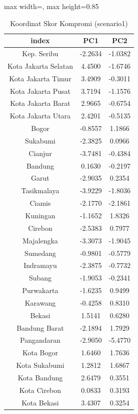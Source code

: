 \begin{table}[H]
\centering
\caption{Koordinat Skor Kompromi (scenario1)} \makeatletter{}\makeatother
\begin{adjustbox}{max width=\textwidth, max height=0.85\textheight}
\begin{tabular}{|c|c|c|}
\hline
\textbf{index} & \textbf{PC1} & \textbf{PC2} \\
\hline
Kep. Seribu & -2.2634 & -1.0382 \\
Kota Jakarta Selatan & 4.4500 & -1.6746 \\
Kota Jakarta Timur & 3.4909 & -0.3011 \\
Kota Jakarta Pusat & 3.7194 & -1.1576 \\
Kota Jakarta Barat & 2.9665 & -0.6754 \\
Kota Jakarta Utara & 2.4201 & -0.5135 \\
Bogor & -0.8557 & 1.1866 \\
Sukabumi & -2.3825 & 0.0966 \\
Cianjur & -3.7481 & -0.4384 \\
Bandung & 0.1630 & -0.2197 \\
Garut & -2.9035 & 0.2354 \\
Tasikmalaya & -3.9229 & -1.8036 \\
Ciamis & -2.1770 & -2.1861 \\
Kuningan & -1.1652 & 1.8326 \\
Cirebon & -2.5383 & 0.7977 \\
Majalengka & -3.3073 & -1.9045 \\
Sumedang & -0.9801 & -0.5779 \\
Indramayu & -2.3875 & -0.7732 \\
Subang & -1.9053 & -0.2341 \\
Purwakarta & -1.6235 & 0.9499 \\
Karawang & -0.4258 & 0.8310 \\
Bekasi & 1.5141 & 0.6280 \\
Bandung Barat & -2.1894 & 1.7929 \\
Pangandaran & -2.9050 & -5.4770 \\
Kota Bogor & 1.6460 & 1.7636 \\
Kota Sukabumi & 1.2812 & 1.6867 \\
Kota Bandung & 2.6479 & 0.3551 \\
Kota Cirebon & 0.0833 & 0.3193 \\
Kota Bekasi & 3.4307 & 0.3254 \\

\end{tabular}
\end{adjustbox}
\end{table}
